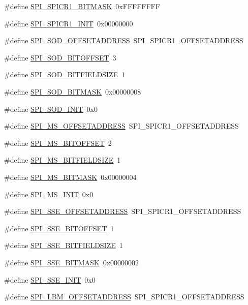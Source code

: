\begin{DoxyCompactItemize}
\item 
\#define \hyperlink{a00573_a019a124d27363e54242e4e1e62f79898}{SPI\_\-SPICR1\_\-BITMASK}~0xFFFFFFFF
\item 
\#define \hyperlink{a00573_a79d063e4103aa31c0352e5b7d4d25377}{SPI\_\-SPICR1\_\-INIT}~0x00000000
\item 
\#define \hyperlink{a00573_a4eab66b23191611aff0e83e2fbe675fd}{SPI\_\-SOD\_\-OFFSETADDRESS}~SPI\_\-SPICR1\_\-OFFSETADDRESS
\item 
\#define \hyperlink{a00573_a0e65fcf38c1b5c01e2fe4e55f38afe1e}{SPI\_\-SOD\_\-BITOFFSET}~3
\item 
\#define \hyperlink{a00573_af0423b1aac41b57d501f48c72eabb6b9}{SPI\_\-SOD\_\-BITFIELDSIZE}~1
\item 
\#define \hyperlink{a00573_a5763ac2483593d523010c18a2a795b10}{SPI\_\-SOD\_\-BITMASK}~0x00000008
\item 
\#define \hyperlink{a00573_ae1877c1d12ba35a6eec07a335b270da2}{SPI\_\-SOD\_\-INIT}~0x0
\item 
\#define \hyperlink{a00573_a159e320823468b3c2978af9095cd1aaf}{SPI\_\-MS\_\-OFFSETADDRESS}~SPI\_\-SPICR1\_\-OFFSETADDRESS
\item 
\#define \hyperlink{a00573_a00fa809aec9920ed92a3abb4a0a8361a}{SPI\_\-MS\_\-BITOFFSET}~2
\item 
\#define \hyperlink{a00573_abec5b657176970f3ac47a472672631a3}{SPI\_\-MS\_\-BITFIELDSIZE}~1
\item 
\#define \hyperlink{a00573_a75e45a9a2f6e215dd944e87a5be985c3}{SPI\_\-MS\_\-BITMASK}~0x00000004
\item 
\#define \hyperlink{a00573_a56ba0df6627cd38d8edfdca3de81495c}{SPI\_\-MS\_\-INIT}~0x0
\item 
\#define \hyperlink{a00573_a172c46569e97fe65061e141abc4ab35b}{SPI\_\-SSE\_\-OFFSETADDRESS}~SPI\_\-SPICR1\_\-OFFSETADDRESS
\item 
\#define \hyperlink{a00573_af6a30258987277a9ea19b5cb36c4d8b0}{SPI\_\-SSE\_\-BITOFFSET}~1
\item 
\#define \hyperlink{a00573_afcf7eb20c32844bb6982d808778b27fb}{SPI\_\-SSE\_\-BITFIELDSIZE}~1
\item 
\#define \hyperlink{a00573_acfaaa8c0edbc2da742d1e3bb4b31a3db}{SPI\_\-SSE\_\-BITMASK}~0x00000002
\item 
\#define \hyperlink{a00573_a4cc4519c062525a4516ac7c0e3e473da}{SPI\_\-SSE\_\-INIT}~0x0
\item 
\#define \hyperlink{a00573_a2afcc7c11f56ce41ab46be6b456cad04}{SPI\_\-LBM\_\-OFFSETADDRESS}~SPI\_\-SPICR1\_\-OFFSETADDRESS

\end{DoxyCompactItemize}
